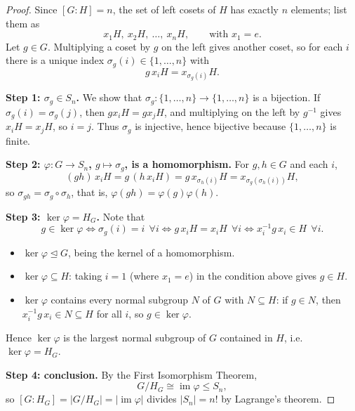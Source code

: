 \documentclass[11pt,a4paper]{article}
\begin{document}
\begin{proof}
	Since $[G:H] = n$, the set of left cosets of $H$ has exactly $n$ elements; list them as
	\[
	x_1 H,\ x_2 H,\ \dots,\ x_n H, \qquad \text{with } x_1 = e.
	\]
	Let $g \in G$. Multiplying a coset by $g$ on the left gives another coset, so for each $i$ there is a unique index $\sigma_g(i) \in \{1, \dots, n\}$ with
	\[
	g\, x_i H = x_{\sigma_g(i)} H .
	\]
	
	\vspace{0.5em}
	\noindent \textbf{Step 1: $\sigma_g \in S_n$.} We show that $\sigma_g \colon \{1,\dots,n\} \to \{1,\dots,n\}$ is a bijection. If $\sigma_g(i) = \sigma_g(j)$, then $g x_i H = g x_j H$, and multiplying on the left by $g^{-1}$ gives $x_i H = x_j H$, so $i = j$. Thus $\sigma_g$ is injective, hence bijective because $\{1,\dots,n\}$ is finite.
	
	\vspace{0.5em}
	\noindent \textbf{Step 2: $\varphi \colon G \to S_n$, $g \mapsto \sigma_g$, is a homomorphism.} For $g, h \in G$ and each $i$,
	\[
	(gh)\, x_i H = g\,(h\, x_i H) = g\, x_{\sigma_h(i)} H = x_{\sigma_g(\sigma_h(i))} H ,
	\]
	so $\sigma_{gh} = \sigma_g \circ \sigma_h$, that is, $\varphi(gh) = \varphi(g)\varphi(h)$.
	
	\vspace{0.5em}
	\noindent \textbf{Step 3: $\ker \varphi = H_G$.} Note that
	\[
	g \in \ker \varphi \iff \sigma_g(i) = i \ \ \forall i \iff g\, x_i H = x_i H \ \ \forall i \iff x_i^{-1} g\, x_i \in H \ \ \forall i .
	\]
	\begin{itemize}
		\item $\ker \varphi \trianglelefteq G$, being the kernel of a homomorphism.
		\item $\ker \varphi \subseteq H$: taking $i = 1$ (where $x_1 = e$) in the condition above gives $g \in H$.
		\item $\ker \varphi$ contains every normal subgroup $N$ of $G$ with $N \subseteq H$: if $g \in N$, then $x_i^{-1} g\, x_i \in N \subseteq H$ for all $i$, so $g \in \ker \varphi$.
	\end{itemize}
	Hence $\ker \varphi$ is the largest normal subgroup of $G$ contained in $H$, i.e.\ $\ker \varphi = H_G$.
	
	\vspace{0.5em}
	\noindent \textbf{Step 4: conclusion.} By the First Isomorphism Theorem,
	\[
	G / H_G \cong \operatorname{im} \varphi \leq S_n ,
	\]
	so $[G : H_G] = |G/H_G| = |\operatorname{im} \varphi|$ divides $|S_n| = n!$ by Lagrange's theorem. \qedhere
\end{proof}
\end{document}

